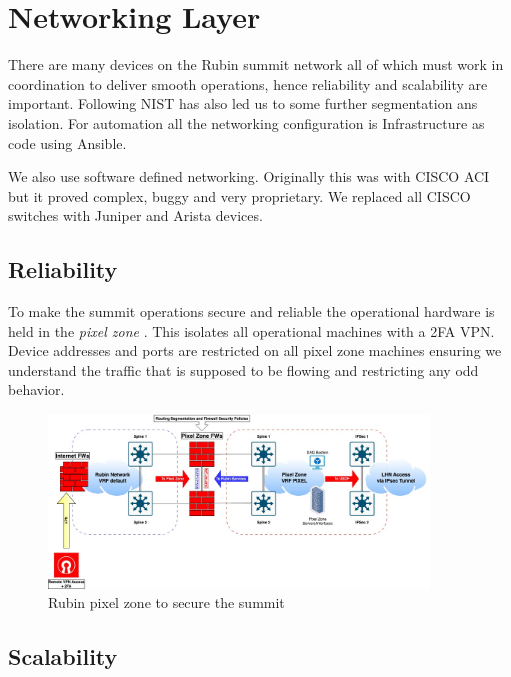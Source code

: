 \section{Networking Layer} \label{sec:networking}

There are many devices on the Rubin summit network all of which must work in coordination to deliver smooth operations, hence reliability and scalability are important.
Following NIST \citep{NIST.SP.800-171} has also led us to some further segmentation ans isolation.
For automation all the networking configuration is Infrastructure as code using Ansible.

We also use software defined networking.
Originally this was with CISCO ACI but it proved complex, buggy and very proprietary.
We replaced all CISCO switches with Juniper and Arista devices.


\subsection{Reliability}

To make the summit operations secure and reliable the operational hardware is held in the \emph{pixel zone}
.
This isolates all operational machines with a 2FA VPN.
Device addresses and ports are restricted on all pixel zone machines ensuring we understand the traffic that
is supposed to be flowing and restricting any odd behavior.

\begin{figure}
\begin{centering}
\includegraphics[width=0.9\textwidth]{images/pixel-zone}
        \caption{Rubin pixel zone to secure the summit
\label{fig:pixel-zone}}
\end{centering}
\end{figure}

\subsection{Scalability}
